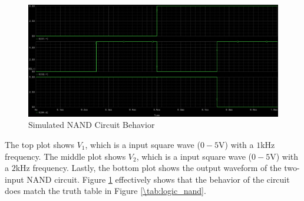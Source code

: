 \begin{figure}[h!]
	\centering
	\includegraphics[scale=0.20]{../images/nand_transient_output.PNG}
	\caption{Simulated NAND Circuit Behavior}
	\label{fig:nand_sim}
\end{figure}

\FloatBarrier

The top plot shows $V_1$, which is a input square wave ($0 - 5$\si{\volt}) with a $1$\si{\kilo\hertz} frequency.
The middle plot shows $V_2$, which is a input square wave ($0 - 5$\si{\volt}) with a $2$\si{\kilo\hertz} frequency.
Lastly, the bottom plot shows the output waveform of the two-input NAND circuit.
Figure \ref{fig:nand_sim} effectively shows that the behavior of the circuit does match the truth table in Figure \ref{\tab:logic_nand}.
